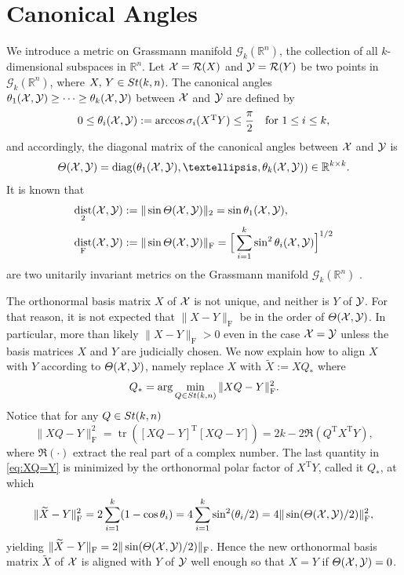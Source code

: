 \documentclass[11pt]{article}
\def\bbR{\mathbb{R}}
\def\scrG{\mathscr{G}}
\def\cR{{\cal R}}
\def\cX{{\cal X}}
\def\cY{{\cal Y}}
\def\wtd{\widetilde}
\newcommand\STM[2]{{\rm St}(#1,#2)}
\DeclareMathOperator{\diag}{diag}
\DeclareMathOperator{\dist}{dist}
\DeclareMathOperator{\tr}{tr}
\DeclareMathOperator{\F}{F}
\DeclareMathOperator{\T}{T}
\theoremstyle{definition}
\numberwithin{equation}{section}
\begin{document}
\clearpage
\appendix

\section{Canonical Angles}\label{sec:angle-space}
We introduce a metric on
Grassmann manifold
$\scrG_k(\bbR^n)$, the collection of all $k$-dimensional subspaces in $\bbR^n$.
Let
$\cX=\cR(X)$ and $\cY=\cR(Y)$ be two points in $\scrG_k(\bbR^n)$, where $X,\,Y\in\STM{k}{n}$. The canonical angles
$\theta_1(\cX,\cY)\ge\cdots\ge\theta_k(\cX,\cY)$ between $\cX$ and $\cY$ are defined by \cite{stsu:1990}
$$
	0\le\theta_i(\cX,\cY):=\arccos \sigma_i(X^{\T}Y)\le\frac {\pi}2 \quad\mbox{for $1\le i\le k$},
$$
and accordingly,
the diagonal matrix of the canonical angles between $\cX$ and $\cY$ is
	$$
	\Theta(\cX,\cY)=\diag(\theta_1(\cX,\cY),\dots,\theta_k(\cX,\cY))\in\bbR^{k\times k}.
	$$
It is known that
	\begin{align}
	\dist_2(\cX,\cY)&:=\|\sin\Theta(\cX,\cY)\|_2=\sin\theta_1(\cX,\cY), \label{eq:sinTheta} \\
    \dist_{\F}(\cX,\cY)&:=\|\sin\Theta(\cX,\cY)\|_{\F}=\Big[\sum_{i=1}^k\sin^2\theta_i(\cX,\cY)\Big]^{1/2} \label{eq:sinTheta:F}
	\end{align}
are two unitarily invariant metrics on the
Grassmann manifold
$\scrG_k(\bbR^n)$  \cite[p.99]{sun:2001}.

The orthonormal basis matrix $X$ of $\cX$ is not unique, and neither is $Y$ of $\cY$. For that reason, it is not expected
that $\|X-Y\|_{\F}$ be in the order of $\Theta(\cX,\cY)$. In particular, more than likely $\|X-Y\|_{\F}>0$ even in the case
$\cX=\cY$ unless the basis matrices $X$ and $Y$ are judicially chosen. We now explain how to align $X$ with $Y$
according to $\Theta(\cX,\cY)$, namely replace $X$ with $\wtd X:=XQ_*$ where
$$
Q_*=\arg\min_{Q\in\STM{k}{n}}\|XQ-Y\|_{\F}^2.
$$
Notice that for any $Q\in\STM{k}{n}$
\begin{equation}\label{eq:XQ=Y}
\|XQ-Y\|_{\F}^2=\tr([XQ-Y]^{\T}[XQ-Y])=2k-2\Re(Q^{\T}X^{\T}Y),
\end{equation}
where $\Re(\cdot)$ extract the real part of a complex number.
The last quantity in \eqref{eq:XQ=Y} is minimized by the orthonormal polar factor of $X^{\T}Y$, called it $Q_*$, at which
\begin{equation}\label{eq:basis-align}
\|\wtd X-Y\|_{\F}^2=2\sum_{i=1}^k(1-\cos\theta_i)=4\sum_{i=1}^k\sin^2(\theta_i/2)=4\|\sin(\Theta(\cX,\cY)/2)\|_{\F}^2,
\end{equation}
yielding $\|\wtd X-Y\|_{\F}=2\|\sin(\Theta(\cX,\cY)/2)\|_{\F}$.
Hence the new orthonormal basis matrix $\wtd X$ of $\cX$ is aligned with $Y$ of $\cY$ well enough so that
$X=Y$ if $\Theta(\cX,\cY)=0$.
\end{document}
